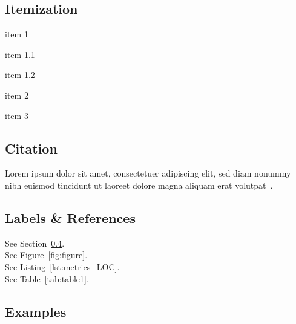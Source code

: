 \subsection{Itemization}
\begin{my_itemize}
	\item {item 1}
	\begin{my_itemize}
		\item {item 1.1}
		\item {item 1.2}
	\end{my_itemize}
	\item {item 2}
	\item {item 3}
\end{my_itemize}
\subsection{Citation}
Lorem ipsum dolor sit amet, consectetuer adipiscing elit, sed diam nonummy nibh euismod tincidunt ut laoreet dolore magna aliquam erat volutpat~\cite{1}.

\subsection{Labels \& References}
See Section~\ref{sec:Examples}.\\
See Figure~\ref{fig:figure}.\\
See Listing~\ref{lst:metrics_LOC}.\\
See Table~\ref{tab:table1}.

\subsection{Examples}
\label{sec:Examples}

